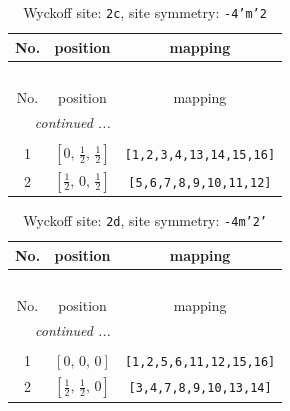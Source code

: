 \documentclass[fleqn,8pt]{jsarticle}
\begin{document}
\renewcommand{\arraystretch}{1.2}
\begin{longtable}{ccc}
\caption{Wyckoff site: {\tt 2c}, site symmetry: {\tt -4'm'2}}
 \\
 \hline \hline
No. & position & mapping \\ \hline \endfirsthead

\multicolumn{2}{l}{\tablename\ \thetable{}} \\
 \hline \hline
No. & position & mapping \\ \hline \endhead

 \hline \hline
\multicolumn{2}{r}{\footnotesize\it continued ...} \\ \endfoot

 \hline \hline
\multicolumn{2}{r}{} \\ \endlastfoot

1 & $\left[ 0,\, \frac{1}{2},\, \frac{1}{2} \right]$ & {\tt [1,2,3,4,13,14,15,16]} \\ \hline
2 & $\left[ \frac{1}{2},\, 0,\, \frac{1}{2} \right]$ & {\tt [5,6,7,8,9,10,11,12]} \\
\end{longtable}
\renewcommand{\arraystretch}{1.2}
\begin{longtable}{ccc}
\caption{Wyckoff site: {\tt 2d}, site symmetry: {\tt -4m'2'}}
 \\
 \hline \hline
No. & position & mapping \\ \hline \endfirsthead

\multicolumn{2}{l}{\tablename\ \thetable{}} \\
 \hline \hline
No. & position & mapping \\ \hline \endhead

 \hline \hline
\multicolumn{2}{r}{\footnotesize\it continued ...} \\ \endfoot

 \hline \hline
\multicolumn{2}{r}{} \\ \endlastfoot

1 & $\left[ 0,\, 0,\, 0 \right]$ & {\tt [1,2,5,6,11,12,15,16]} \\ \hline
2 & $\left[ \frac{1}{2},\, \frac{1}{2},\, 0 \right]$ & {\tt [3,4,7,8,9,10,13,14]} \\
\end{longtable}
\renewcommand{\arraystretch}{1.2}
\end{document}
